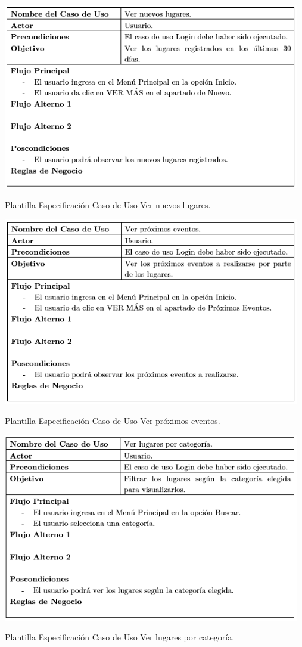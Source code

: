 \documentclass[12pt,letterpaper,openany]{book}
\begin{document}
\begin{table}[H]
\centering
\includegraphics[width=13cm]{./imagenes/PCU/ver_nuevos_lugares}
\caption{Plantilla Especificación Caso de Uso Ver nuevos lugares.}
\end{table}

\begin{table}[H]
\centering
\includegraphics[width=13cm]{./imagenes/PCU/ver_proximos_eventos}
\caption{Plantilla Especificación Caso de Uso Ver próximos eventos.}
\end{table}

\begin{table}[H]
\centering
\includegraphics[width=13cm]{./imagenes/PCU/ver_lugares_categoria}
\caption{Plantilla Especificación Caso de Uso Ver lugares por categoría.}
\end{table}
\end{document}
